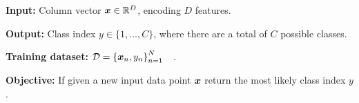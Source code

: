\documentclass[../../main.tex]{subfiles}
\begin{document}
\textbf{Input:} Column vector $\bm{x} \in \mathbb{R}^D$, encoding $D$ features.

\textbf{Output:} Class index $y \in \{1, \ldots, C\}$, where there are a total of $C$ possible classes.

\textbf{Training dataset:} $\mathcal{D} = {\{\bm{x}_n, y_n\}}_{n=1}^N \quad$.

\textbf{Objective:} If given a new input data point $\bm{x}$ return the most likely class index $y$.
\end{document}
